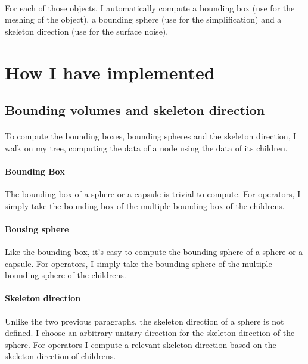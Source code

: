 \documentclass[a4paper,12pt]{article}
\begin{document}
\paragraph{} For each of those objects, I automatically compute a bounding box (use for the meshing of the object), a bounding sphere (use for the simplification) and a skeleton direction (use for the surface noise).

\section*{How I have implemented}


\subsection*{Bounding volumes and skeleton direction}

\paragraph{} To compute the bounding boxes, bounding spheres and the skeleton direction, I walk on my tree, computing the data of a node using the data of its children.

\paragraph{Bounding Box} The bounding box of a sphere or a capsule is trivial to compute. For operators, I simply take the bounding box of the multiple bounding box of the childrens.

\paragraph{Bousing sphere} Like the bounding box, it's easy to compute the bounding sphere of a sphere or a capsule. For operators, I simply take the bounding sphere of the multiple bounding sphere of the childrens.


\paragraph{Skeleton direction} Unlike the two previous paragraphs, the skeleton direction of a sphere is not defined. I choose an arbitrary unitary direction for the skeleton direction of the sphere. For operators I compute a relevant skeleton direction based on the skeleton direction of childrens.
\end{document}
